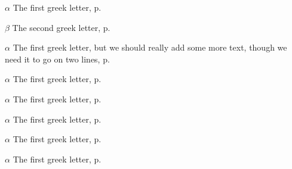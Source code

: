 \begin{eqlist}

\item[$\alpha$]
The first greek letter, p.~\pageref{}

\item[$\beta$]
The second greek letter, p.~\pageref{}

\item[$\alpha$]
The first greek letter, but we should really add some more text, though we need it to go on two lines, p.~\pageref{}

\item[$\alpha$]
The first greek letter, p.~\pageref{}

\item[$\alpha$]
The first greek letter, p.~\pageref{}

\item[$\alpha$]
The first greek letter, p.~\pageref{}

\item[$\alpha$]
The first greek letter, p.~\pageref{}

\item[$\alpha$]
The first greek letter, p.~\pageref{}

\end{eqlist}
